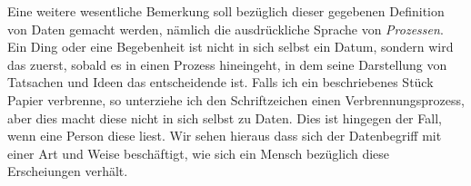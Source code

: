 {Eine weitere wesentliche Bemerkung soll bezüglich dieser gegebenen Definition von Daten gemacht werden, nämlich die ausdrückliche Sprache von \emph{Prozessen}. Ein Ding oder eine Begebenheit ist nicht in sich selbst ein Datum, sondern wird das zuerst, sobald es in einen Prozess hineingeht, in dem seine Darstellung von Tatsachen und Ideen das entscheidende ist. Falls ich ein beschriebenes Stück Papier verbrenne, so unterziehe ich den Schriftzeichen einen Verbrennungsprozess, aber dies macht diese nicht in sich selbst zu Daten. Dies ist hingegen der Fall, wenn eine Person diese liest. Wir sehen hieraus dass sich der Datenbegriff mit einer Art und Weise beschäftigt, wie sich ein Mensch bezüglich diese Erscheiungen verhält.  
}


